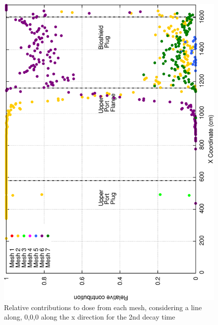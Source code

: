 \documentclass[12pt]{article}
\begin{document}
\begin{figure}[ht!]
\centering
\includegraphics[clip,scale=0.25]{../plots/crosstalk/b4c/up/dc2_rel.png}
\caption{Relative contributions to dose from each mesh, considering a line along, 0,0,0 along the x direction for the 2nd decay time}
\label{fig:b4c_ct_up_dc2_rel}
\end{figure}
\end{document}
